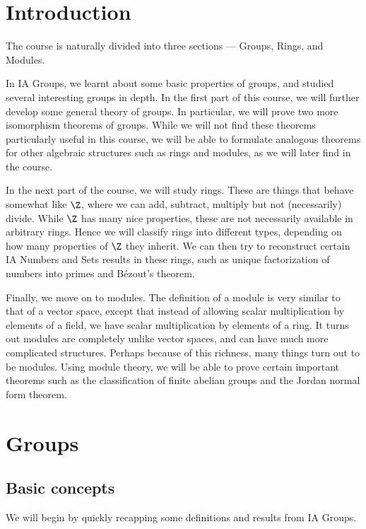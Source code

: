 \documentclass[a4paper]{article}
\begin{document}
\tableofcontents
\setcounter{section}{-1}
\section{Introduction}
The course is naturally divided into three sections --- Groups, Rings, and Modules.

In IA Groups, we learnt about some basic properties of groups, and studied several interesting groups in depth. In the first part of this course, we will further develop some general theory of groups. In particular, we will prove two more isomorphism theorems of groups. While we will not find these theorems particularly useful in this course, we will be able to formulate analogous theorems for other algebraic structures such as rings and modules, as we will later find in the course.

In the next part of the course, we will study rings. These are things that behave somewhat like $\Z$, where we can add, subtract, multiply but not (necessarily) divide. While $\Z$ has many nice properties, these are not necessarily available in arbitrary rings. Hence we will classify rings into different types, depending on how many properties of $\Z$ they inherit. We can then try to reconstruct certain IA Numbers and Sets results in these rings, such as unique factorization of numbers into primes and B\'ezout's theorem.

Finally, we move on to modules. The definition of a module is very similar to that of a vector space, except that instead of allowing scalar multiplication by elements of a field, we have scalar multiplication by elements of a ring. It turns out modules are completely unlike vector spaces, and can have much more complicated structures. Perhaps because of this richness, many things turn out to be modules. Using module theory, we will be able to prove certain important theorems such as the classification of finite abelian groups and the Jordan normal form theorem.

\section{Groups}
\subsection{Basic concepts}
We will begin by quickly recapping some definitions and results from IA Groups.
\end{document}
